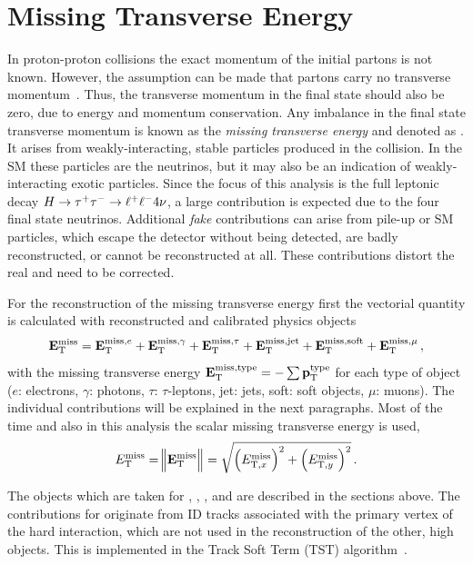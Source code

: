 \section{Missing Transverse Energy}\label{sec:object_selection:missing_transverse_energy}

In proton-proton collisions the exact momentum of the initial partons is not known.
However, the assumption can be made that partons carry no transverse momentum~\cite{PhysRev.185.1975}.
Thus, the transverse momentum in the final state should also be zero, due to energy and momentum conservation.
Any imbalance in the final state transverse momentum is known as the \emph{missing transverse energy} and denoted as \etmiss.
It arises from weakly-interacting, stable particles produced in the collision.
In the SM these particles are the neutrinos, but it may also be an indication of weakly-interacting exotic particles.
Since the focus of this analysis is the full leptonic decay $H \to \tau^+\tau^- \to \ell^+\ell^- 4\nu$, a large \etmiss{} contribution is expected
due to the four final state neutrinos.
Additional \emph{fake} \etmiss{} contributions can arise from pile-up or SM particles, which escape the detector without
being detected, are badly reconstructed, or cannot be reconstructed at all. These contributions distort the real \etmiss{}
and need to be corrected.

For the reconstruction of the missing transverse energy first the vectorial quantity \etmissvec{} is calculated
with reconstructed and calibrated physics objects~\cite{ATL-PHYS-PUB-2015-023}
\begin{equation}
    \label{eq:met:vector}
    \mathbf{E}_\text{T}^\text{miss} = \mathbf{E}_\text{T}^{\text{miss},e} + \mathbf{E}_\text{T}^{\text{miss},\gamma} + \mathbf{E}_\text{T}^{\text{miss},\tau} + \mathbf{E}_\text{T}^{\text{miss},\text{jet}} + \mathbf{E}_\text{T}^{\text{miss},\text{soft}} + \mathbf{E}_\text{T}^{\text{miss},\mu} \,,
\end{equation}
with the missing transverse energy $\mathbf{E}_\text{T}^{\text{miss},\text{type}} = - \sum \mathbf{p}_\text{T}^\text{type}$ for each type of object
($e$: electrons, $\gamma$: photons, $\tau$: $\tau$-leptons, jet: jets, soft: soft objects, $\mu$: muons).
The individual contributions will be explained in the next paragraphs.
Most of the time and also in this analysis the scalar missing transverse energy \etmiss{} is used,
\begin{equation}
    \label{eq:met:scalar}
    E_\text{T}^\text{miss}{} = \norm{\mathbf{E}_\text{T}^\text{miss}{}} = \sqrt{{\left(E_{\text{T},x}^\text{miss}\right)}^2 + {\left(E_{\text{T},y}^\text{miss}\right)}^2} \,.
\end{equation}

The objects which are taken for , \etmissvecobj{\mu}, \etmissvecobj{\tau},
and  are described in the sections above.
The contributions for  originate from  ID tracks associated with the primary vertex of the
hard interaction, which are not used in the reconstruction of the other, high \pt{} objects.
This is implemented in the Track Soft Term (TST) algorithm~\cite{ATL-PHYS-PUB-2015-023}.

